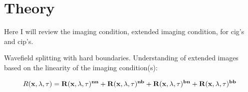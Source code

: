 \section{Theory}

Here I will review the imaging condition, extended imaging condition,
for cig's and cip's. 

Wavefield splitting with hard boundaries. Understanding of extended images
based on the linearity of the imaging condition(s):

\[
R(\bf{x},\lambda,\tau)= R(\bf{x},\lambda,\tau)^{nn} + R(\bf{x},\lambda,\tau)^{nb} +R(\bf{x},\lambda,\tau)^{bn} +R(\bf{x},\lambda,\tau)^{bb}
\]
